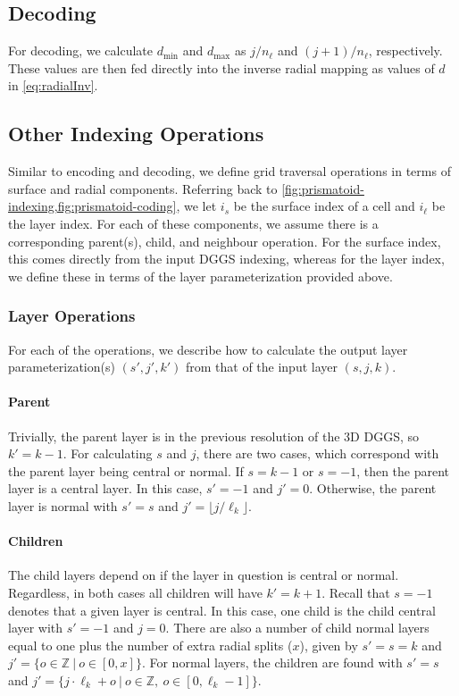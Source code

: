 \subsection{Decoding}
For decoding, we calculate $d_\mathrm{min}$ and $d_\mathrm{max}$ as $j/n_\ell$ and $(j+1)/n_\ell$, respectively.
These values are then fed directly into the inverse radial mapping as values of $d$ in \cref{eq:radialInv}.


\subsection{Other Indexing Operations}
Similar to encoding and decoding, we define grid traversal operations in terms of surface and radial components.
Referring back to \cref{fig:prismatoid-indexing,fig:prismatoid-coding}, we let $i_s$ be the surface index of a cell and $i_\ell$ be the layer index.
For each of these components, we assume there is a corresponding parent(s), child, and neighbour operation.
For the surface index, this comes directly from the input DGGS indexing, whereas for the layer index, we define these in terms of the layer parameterization provided above.


\subsubsection{Layer Operations}
For each of the operations, we describe how to calculate the output layer parameterization(s) $(s',j',k')$ from that of the input layer $(s,j,k)$.


\paragraph{Parent}
Trivially, the parent layer is in the previous resolution of the 3D DGGS, so $k' = k - 1$.
For calculating $s$ and $j$, there are two cases, which correspond with the parent layer being central or normal.
If $s = k-1$ or $s = -1$, then the parent layer is a central layer. In this case, $s' = -1$ and $j' = 0$.
Otherwise, the parent layer is normal with $s' = s$ and $j' = \lfloor j / \ell_k \rfloor$.


\paragraph{Children}
The child layers depend on if the layer in question is central or normal.
Regardless, in both cases all children will have $k' = k + 1$.
Recall that $s = -1$ denotes that a given layer is central.
In this case, one child is the child central layer with $s' = -1$ and $j = 0$.
There are also a number of child normal layers equal to one plus the number of extra radial splits ($x$), given by $s' = s = k$ and $j' = \{ o \in \mathbb{Z} \ | \ o \in [0, x] \}$.
For normal layers, the children are found with $s' = s$ and $j' = \{ j \cdot \ell_k + o \ | \  o \in \mathbb{Z}, \ o \in [0, \ell_k - 1] \}$.


